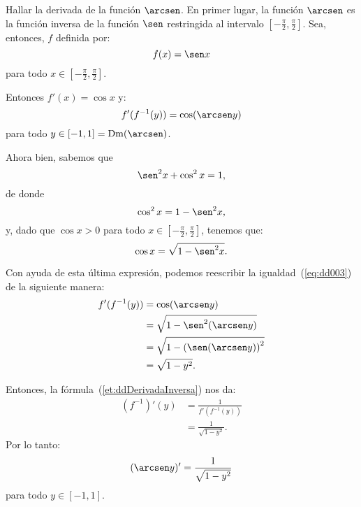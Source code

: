\begin{exemplo}[Solución]{%
Hallar la derivada de la función $\arcsen$.
}%
En primer lugar, la función $\arcsen$ es la función inversa de la función $\sen$ restringida al
intervalo $[-\frac{\pi}{2},\frac{\pi}{2}]$. Sea, entonces, $f$ definida por:
\[
f(x) = \sen x
\]
para todo $x\in [-\frac{\pi}{2},\frac{\pi}{2}]$.

Entonces $f'(x) = \cos x$ y:
\begin{equation}
\label{eq:dd003}
f'(f^{-1}(y)) = \cos(\arcsen y)
\end{equation}
para todo $y \in [-1,1] = \Dm(\arcsen)$.

Ahora bien, sabemos que
\[
\sen^2 x + \cos^2 x = 1,
\]
de donde
\[
\cos^2 x = 1 - \sen^2 x,
\]
y, dado que $\cos x > 0$ para todo $x\in [-\frac{\pi}{2},\frac{\pi}{2}]$, tenemos que:
\[
\cos x = \sqrt{1 - \sen^2 x}.
\]

Con ayuda de esta última expresión, podemos reescribir la igualdad~(\ref{eq:dd003}) de la siguiente
manera:
\begin{align*}
f'(f^{-1}(y)) &= \cos(\arcsen y) \\
   &= \sqrt{1 - \sen^2(\arcsen y)} \\
   &= \sqrt{1 - \left(\sen(\arcsen y)\right)^2} \\
   &= \sqrt{1 - y^2}.
\end{align*}

Entonces, la fórmula~(\ref{et:ddDerivadaInversa}) nos da:
\begin{align*}
(f^{-1})'(y) &= \frac{1}{f'(f^{-1}(y))} \\[4pt]
   &= \frac{1}{\sqrt{1 - y^2}}.
\end{align*}
Por lo tanto:
\[
(\arcsen y)' = \frac{1}{\sqrt{1 - y^2}}
\]
para todo $y\in [-1,1]$.
\end{exemplo}


